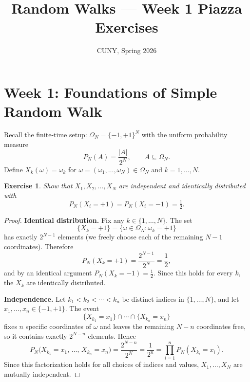 \documentclass[12pt]{article}
\title{Random Walks --- Week 1 Piazza Exercises}
\author{CUNY, Spring 2026}
\date{}
\newtheorem{exercise}{Exercise}
\begin{document}
\maketitle

\section*{Week 1: Foundations of Simple Random Walk}

Recall the finite-time setup: $\Omega_N = \{-1,+1\}^N$ with the uniform probability measure
\[
  P_N(A) = \frac{|A|}{2^N}, \qquad A \subseteq \Omega_N.
\]
Define $X_k(\omega) = \omega_k$ for $\omega = (\omega_1, \ldots, \omega_N) \in \Omega_N$ and $k = 1, \ldots, N$.

\begin{exercise}
Show that $X_1, X_2, \ldots, X_N$ are independent and identically distributed with
\[
  P_N(X_i = +1) = P_N(X_i = -1) = \tfrac{1}{2}.
\]
\end{exercise}

\begin{proof}
\textbf{Identical distribution.} Fix any $k \in \{1,\ldots,N\}$. The set
\[
  \{X_k = +1\} = \{\omega \in \Omega_N : \omega_k = +1\}
\]
has exactly $2^{N-1}$ elements (we freely choose each of the remaining $N-1$ coordinates). Therefore
\[
  P_N(X_k = +1) = \frac{2^{N-1}}{2^N} = \frac{1}{2},
\]
and by an identical argument $P_N(X_k = -1) = \tfrac{1}{2}$. Since this holds for every $k$, the $X_k$ are identically distributed.

\textbf{Independence.} Let $k_1 < k_2 < \cdots < k_n$ be distinct indices in $\{1,\ldots,N\}$, and let $x_1, \ldots, x_n \in \{-1,+1\}$. The event
\[
  \{X_{k_1} = x_1\} \cap \cdots \cap \{X_{k_n} = x_n\}
\]
fixes $n$ specific coordinates of $\omega$ and leaves the remaining $N-n$ coordinates free, so it contains exactly $2^{N-n}$ elements. Hence
\[
  P_N\!\bigl(X_{k_1}=x_1,\,\ldots,\,X_{k_n}=x_n\bigr)
  = \frac{2^{N-n}}{2^N} = \frac{1}{2^n}
  = \prod_{i=1}^n P_N(X_{k_i} = x_i).
\]
Since this factorization holds for all choices of indices and values, $X_1, \ldots, X_N$ are mutually independent.
\end{proof}
\end{document}
